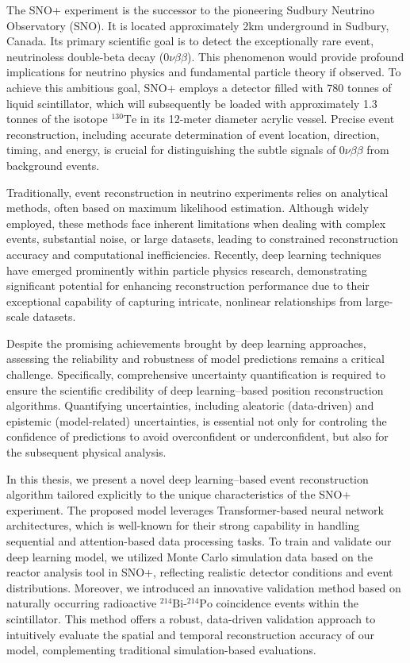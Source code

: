 \begin{enabstract}

The SNO+ experiment is the successor to the pioneering Sudbury 
Neutrino Observatory (SNO). It is located approximately 2km 
underground in Sudbury, Canada. Its primary scientific goal is 
to detect the exceptionally rare event, neutrinoless double-beta 
decay (0$\nu\beta\beta$). This phenomenon would provide profound 
implications for neutrino physics and fundamental particle theory 
if observed. To achieve this ambitious goal, SNO+ employs a 
detector filled with 780 tonnes of liquid scintillator, which 
will subsequently be loaded with approximately 1.3 tonnes of 
the isotope $^{130}\mathrm{Te}$ in its 12-meter diameter acrylic 
vessel. Precise event reconstruction, including accurate 
determination of event location, direction, timing, and energy, 
is crucial for distinguishing the subtle signals of 0$\nu\beta\beta$ 
from background events.

Traditionally, event reconstruction in neutrino experiments 
relies on analytical methods, often based on maximum likelihood 
estimation. Although widely employed, these methods face 
inherent limitations when dealing with complex events, substantial 
noise, or large datasets, leading to constrained reconstruction 
accuracy and computational inefficiencies. Recently, 
deep learning techniques have emerged prominently 
within particle physics research, demonstrating significant 
potential for enhancing reconstruction performance due to 
their exceptional capability of capturing intricate, nonlinear 
relationships from large-scale datasets.

Despite the promising achievements brought by deep learning approaches, 
assessing the reliability and robustness of model predictions 
remains a critical challenge. Specifically, comprehensive 
uncertainty quantification is required to ensure the scientific 
credibility of deep learning–based position reconstruction algorithms. Quantifying uncertainties, including aleatoric (data-driven) and epistemic (model-related) uncertainties, is essential not only for controling the confidence of predictions to avoid overconfident or underconfident, but also for the subsequent physical analysis.

In this thesis, we present a novel deep learning–based event 
reconstruction algorithm tailored explicitly to the unique 
characteristics of the SNO+ experiment. The proposed model 
leverages Transformer-based neural network architectures, 
which is well-known for their strong capability in handling 
sequential and attention-based data processing tasks. To 
train and validate our deep learning model, we utilized Monte Carlo 
simulation data based on the reactor analysis tool in SNO+, 
reflecting realistic detector conditions and event distributions. 
Moreover, we introduced an innovative validation method based on 
naturally occurring radioactive 
$^{214}\mathrm{Bi}$-$^{214}\mathrm{Po}$ coincidence events within 
the scintillator. This method offers a robust, data-driven 
validation approach to intuitively evaluate the spatial and 
temporal reconstruction accuracy of our model, complementing 
traditional simulation-based evaluations.


\end{enabstract}
